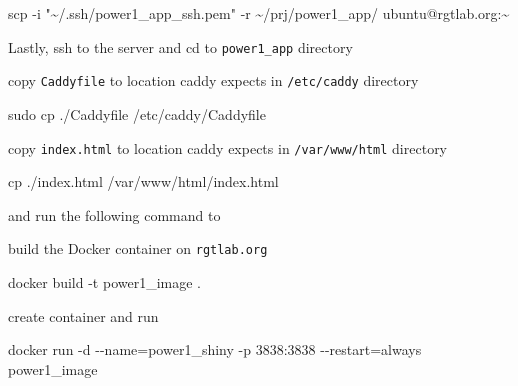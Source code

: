 \documentclass[
  letterpaper,
  DIV=11,
  numbers=noendperiod,
  oneside]{scrartcl}
\newenvironment{Shaded}{\begin{snugshade}}{\end{snugshade}}
\newcommand{\AttributeTok}[1]{\textcolor[rgb]{0.40,0.45,0.13}{#1}}
\newcommand{\ExtensionTok}[1]{\textcolor[rgb]{0.00,0.23,0.31}{#1}}
\newcommand{\FunctionTok}[1]{\textcolor[rgb]{0.28,0.35,0.67}{#1}}
\newcommand{\NormalTok}[1]{\textcolor[rgb]{0.00,0.23,0.31}{#1}}
\newcommand{\OperatorTok}[1]{\textcolor[rgb]{0.37,0.37,0.37}{#1}}
\newcommand{\StringTok}[1]{\textcolor[rgb]{0.13,0.47,0.30}{#1}}
\begin{document}
\begin{Shaded}
\begin{Highlighting}[]
\FunctionTok{scp} \AttributeTok{{-}i} \StringTok{"\textasciitilde{}/.ssh/power1\_app\_ssh.pem"} \AttributeTok{{-}r}\NormalTok{ \textasciitilde{}/prj/power1\_app/  ubuntu@rgtlab.org:\textasciitilde{}}
\end{Highlighting}
\end{Shaded}

Lastly, ssh to the server and cd to \texttt{power1\_app} directory

copy \texttt{Caddyfile} to location caddy expects in \texttt{/etc/caddy}
directory

\begin{Shaded}
\begin{Highlighting}[]
\FunctionTok{sudo}\NormalTok{ cp ./Caddyfile /etc/caddy/Caddyfile }
\end{Highlighting}
\end{Shaded}

copy \texttt{index.html} to location caddy expects in
\texttt{/var/www/html} directory

\begin{Shaded}
\begin{Highlighting}[]
\FunctionTok{cp}\NormalTok{  ./index.html /var/www/html/index.html }
\end{Highlighting}
\end{Shaded}

and run the following command to

build the Docker container on \texttt{rgtlab.org}

\begin{Shaded}
\begin{Highlighting}[]
\ExtensionTok{docker}\NormalTok{ build }\AttributeTok{{-}t}\NormalTok{ power1\_image .}
\end{Highlighting}
\end{Shaded}

create container and run

\begin{Shaded}
\begin{Highlighting}[]
\ExtensionTok{docker}\NormalTok{ run }\AttributeTok{{-}d} \AttributeTok{{-}{-}name}\OperatorTok{=}\NormalTok{power1\_shiny }\AttributeTok{{-}p}\NormalTok{ 3838:3838 }\AttributeTok{{-}{-}restart}\OperatorTok{=}\NormalTok{always power1\_image}
\end{Highlighting}
\end{Shaded}
\end{document}
